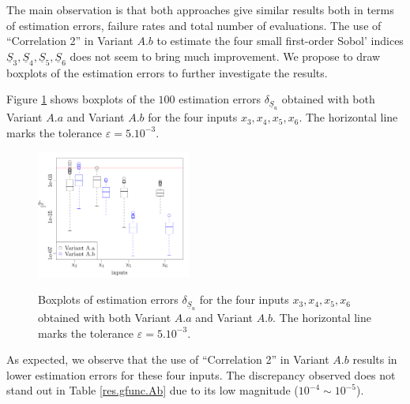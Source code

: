 The main observation is that both approaches give similar results both in terms of estimation errors, failure rates and total number of evaluations. The use of ``Correlation 2'' in Variant $A.b$ to estimate the four small first-order Sobol' indices $\underline{S}_3, \underline{S}_4, \underline{S}_5, \underline{S}_6$ does not seem to bring much improvement. We propose to draw boxplots of the estimation errors to further investigate the results. 

Figure \ref{boxplots.gfunc} shows boxplots of the $100$ estimation errors $\delta_{\underline{S}_u}$ obtained with both Variant $A.a$ and Variant $A.b$ for the four inputs $x_3,x_4,x_5,x_6$. The horizontal line marks the tolerance $\varepsilon=5.10^{-3}$.
\begin{figure}[!ht]
\caption{Boxplots of estimation errors $\delta_{\underline{S}_u}$ for the four inputs $x_3,x_4,x_5,x_6$ obtained with both Variant $A.a$ and Variant $A.b$. The horizontal line marks the tolerance $\varepsilon=5.10^{-3}$.}
\centering
\includegraphics[width=0.45\textwidth]{Images/boxplots.pdf}
\label{boxplots.gfunc}
\end{figure}
As expected, we observe that the use of ``Correlation 2'' in Variant $A.b$ results in lower estimation errors for these four inputs. The discrepancy observed does not stand out in Table \ref{res.gfunc.Ab} due to its low magnitude ($10^{-4} \sim 10^{-5}$).
\bigskip

